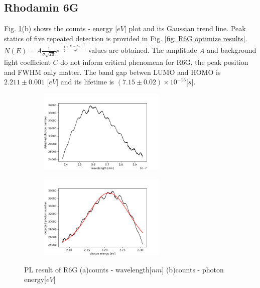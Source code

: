\documentclass{article}
\begin{document}
\subsection{Rhodamin 6G}
 Fig. \ref{fig: R6G results}(b) shows the counts - energy [$eV$] plot and its Gaussian trend line.
 Peak statics of five repeated detection is provided in Fig. \ref{fig: R6G optimize results}.
 $N(E) = A \frac{1} {\sigma \sqrt{2\pi}} e^{-\frac{1}{2} \frac{(E-E_0)^2}{\sigma^2}}$ values are obtained.
 The amplitude $A$ and background light coefficient $C$ do not inform critical phenomena for R6G, the peak position and FWHM only matter.
 The band gap betwen LUMO and HOMO is $2.211 \pm 0.001$ [$eV$] and its lifetime is $(7.15 \pm 0.02) \times 10^{-15} $[$s$].
 \begin{figure}[ht]
  \centering
  \begin{subfigure}[b]{6cm}
      \centering
      \includegraphics[width=6cm]{../results/R6G(1)_raw_fig.png}
      \caption{}
  \end{subfigure}
  \hfill
  \begin{subfigure}[b]{6cm}
      \centering
      \includegraphics[width=6cm]{../results/R6G(1)_gaussian_fitted_fig.png}
      \caption{}
  \end{subfigure}
  \hfill
  \caption{PL result of R6G (a)counts - wavelength[$nm$] (b)counts - photon energy[$eV$]}
  \label{fig: R6G results}
\end{figure}
\end{document}
